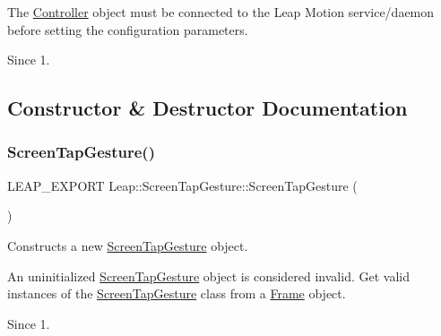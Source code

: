 \begin{DoxyCodeInclude}
\end{DoxyCodeInclude}


The \hyperlink{class_leap_1_1_controller}{Controller} object must be connected to the Leap Motion service/daemon before setting the configuration parameters.

\begin{DoxySince}{Since}
1. 
\end{DoxySince}


\subsection{Constructor \& Destructor Documentation}
\mbox{\label{class_leap_1_1_screen_tap_gesture_a9c58b16806da33ae61a090f16eb0f750}} 
\subsubsection{\texorpdfstring{Screen\+Tap\+Gesture()}{ScreenTapGesture()}\hspace{0.1cm}{\footnotesize\ttfamily [1/2]}}
{\footnotesize\ttfamily L\+E\+A\+P\+\_\+\+E\+X\+P\+O\+RT Leap\+::\+Screen\+Tap\+Gesture\+::\+Screen\+Tap\+Gesture (\begin{DoxyParamCaption}{ }\end{DoxyParamCaption})}

Constructs a new \hyperlink{class_leap_1_1_screen_tap_gesture}{Screen\+Tap\+Gesture} object.

An uninitialized \hyperlink{class_leap_1_1_screen_tap_gesture}{Screen\+Tap\+Gesture} object is considered invalid. Get valid instances of the \hyperlink{class_leap_1_1_screen_tap_gesture}{Screen\+Tap\+Gesture} class from a \hyperlink{class_leap_1_1_frame}{Frame} object. \begin{DoxySince}{Since}
1. 
\end{DoxySince}
\mbox{\label{class_leap_1_1_screen_tap_gesture_a1f433e04b2e6adb7a95811c496397ab6}} 

